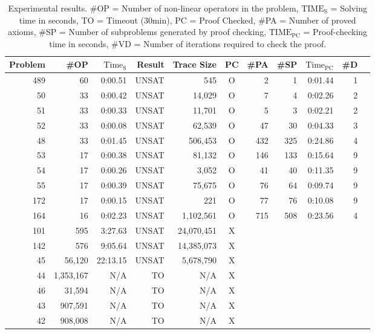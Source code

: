 \begin{table}[h]
  \begin{center}
    \begin{tabular}{|r||r|r|r||r||c|r|r|r|r|r|}
      \hline
      Problem&  \#OP  & $\mathrm{Time_S}$&    Result&     Trace Size& PC&  \#PA& \#SP& $\mathrm{Time_{PC}}$ & \#D\\
      \hline
      \hline
      489&       60&   0:00.51&     UNSAT&            545&O&    2&    1& 0:01.44& 1\\
       50&       33&   0:00.42&     UNSAT&         14,029&O&    7&    4& 0:02.26& 2\\
       51&       33&   0:00.33&     UNSAT&         11,701&O&    5&    3& 0:02.21& 2\\
       52&       33&   0:00.08&     UNSAT&         62,539&O&   47&   30& 0:04.33& 3\\
       48&       33&   0:01.45&     UNSAT&        506,453&O&  432&  325& 0:24.86& 4\\
       53&       17&   0:00.38&     UNSAT&         81,132&O&  146&  133& 0:15.64& 9\\
       54&       17&   0:00.26&     UNSAT&          3,052&O&   41&   40& 0:11.35& 9\\
       55&       17&   0:00.39&     UNSAT&         75,675&O&   76&   64& 0:09.74& 9\\
      172&       17&   0:00.15&     UNSAT&            221&O&   77&   76& 0:10.08& 9\\
      164&       16&   0:02.23&     UNSAT&      1,102,561&O&  715&  508& 0:23.56& 4\\
      \hline
      101&      595&   3:27.63&     UNSAT&     24,070,451&X&     &     &        &\\
      142&      576&   9:05.64&     UNSAT&     14,385,073&X&     &     &        &\\
       45&   56,120&  22:13.15&     UNSAT&      5,678,790&X&     &     &        &\\
      \hline
       44&1,353,167&       N/A&       TO&             N/A&X&     &     &        &\\
       46&   31,594&       N/A&       TO&             N/A&X&     &     &        &\\
       43&  907,591&       N/A&       TO&             N/A&X&     &     &        &\\
       42&  908,008&       N/A&       TO&             N/A&X&     &     &        &\\
      \hline
    \end{tabular}
  \caption{
    Experimental results.
    \#OP = Number of non-linear operators in the problem,
    $\mathrm{TIME_S}$ = Solving time in seconds,
    TO = Timeout (30min),
    PC = Proof Checked,
    \#PA = Number of proved axioms,
    \#SP = Number of subproblems generated by proof checking,
    $\mathrm{TIME_{PC}}$ = Proof-checking time in seconds,
    \#VD = Number of iterations required to check the proof.
  }
  \end{center}
\end{table}
